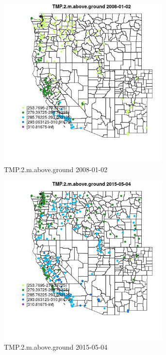 \begin{figure} 
\centering  
\includegraphics[width=0.77\textwidth]{Code_Outputs/Report_ML_input_PM25_Step4_part_e_de_duplicated_aves_compiled_2019-05-18wNAs_MapObsTMP2maboveground2008-01-02.jpg} 
\caption{\label{fig:Report_ML_input_PM25_Step4_part_e_de_duplicated_aves_compiled_2019-05-18wNAsMapObsTMP2maboveground2008-01-02}TMP.2.m.above.ground 2008-01-02} 
\end{figure} 
 

\begin{figure} 
\centering  
\includegraphics[width=0.77\textwidth]{Code_Outputs/Report_ML_input_PM25_Step4_part_e_de_duplicated_aves_compiled_2019-05-18wNAs_MapObsTMP2maboveground2015-05-04.jpg} 
\caption{\label{fig:Report_ML_input_PM25_Step4_part_e_de_duplicated_aves_compiled_2019-05-18wNAsMapObsTMP2maboveground2015-05-04}TMP.2.m.above.ground 2015-05-04} 
\end{figure} 
 

